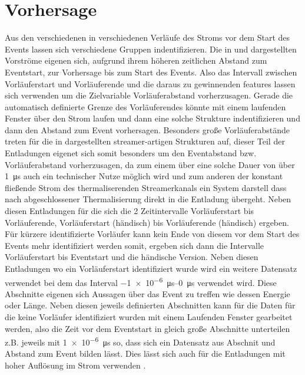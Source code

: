\chapter{Vorhersage}
\label{chap:prediction}

Aus den verschiedenen in  verschiedenen Verläufe des Stroms vor dem Start des Events lassen sich verschiedene Gruppen indentifizieren. Die in  und  dargestellten Vorströme eigenen sich, aufgrund ihrem höheren zeitlichen Abstand zum Eventstart, zur Vorhersage bis zum Start des Events. Also das Intervall zwischen Vorläuferstart und Vorläuferende und die daraus zu gewinnenden features lassen sich verwenden um die Zielvariable Vorläuferabstand vorherzusagen. Gerade die automatisch definierte Grenze des Vorläuferendes könnte mit einem laufenden Fenster über den Strom laufen und dann eine solche Strukture indentifizieren und dann den Abstand zum Event vorhersagen. Besonders große Vorläuferabstände treten für die in  dargestellten streamer-artigen Strukturen auf, dieser Teil der Entladungen eigenet sich somit besonders um den Eventabstand bzw. Vorläuferabstand vorherzusagen, da zum einem über eine solche Dauer von über \SI{1}{\micro\second} auch ein technischer Nutze möglich wird und zum anderen der konstant fließende Strom des thermaliserenden Streamerkanals ein System darstell dass nach abgeschlossener Thermalisierung direkt in die Entladung übergeht. Neben diesen Entladungen für die sich die 2 Zeitintervalle Vorläuferstart bis Vorläuferende, Vorläuferstart (händisch) bis Vorläuferende (händisch) ergeben. Für kürzere identifizierte Vorläufer kann kein Ende von diesem vor dem Start des Events mehr identifiziert werden somit, ergeben sich dann die Intervalle Vorläuferstart bis Eventstart und die händische Version. Neben diesen Entladungen wo ein Vorläuferstart identifiziert wurde wird ein weitere Datensatz verwendet bei dem das Interval \SIrange{-1e-6}{0}{\micro\second} verwendet wird. Diese Abschnitte eigenen sich Aussagen über das Event zu treffen wie dessen Energie oder Länge. Neben diesen jeweils definierten Abschnitten kann für die Daten für die keine Vorläufer identifiziert wurden mit einem Laufenden Fenster gearbeitet werden, also die Zeit vor dem Eventstart in gleich große Abschnitte unterteilen z.B. jeweils mit \SI{1e-6}{\micro\second} so, dass sich ein Datensatz aus Abschnit und Abstand zum Event bilden lässt. Dies lässt sich auch für die Entladungen mit hoher Auflösung im Strom verwenden .




